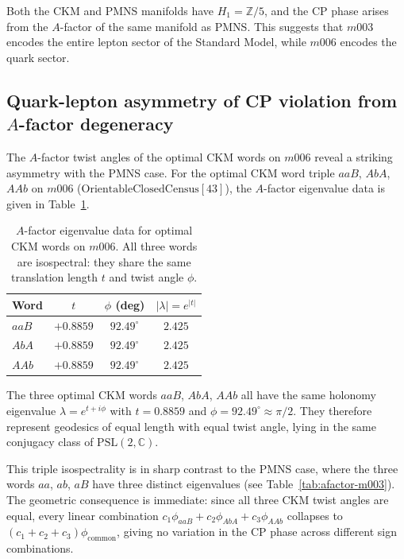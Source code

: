 ﻿\documentclass[epjc3]{svjour3}
\begin{document}
Both the CKM and PMNS manifolds have $H_1 = \mathbb{Z}/5$, and the
CP phase arises from the $A$-factor of the same manifold as PMNS.
This suggests that $m003$ encodes the entire lepton sector of the
Standard Model, while $m006$ encodes the quark sector.

\subsection{Quark-lepton asymmetry of CP violation from $A$-factor degeneracy}
\label{subsec:asymmetry}

The $A$-factor twist angles of the optimal CKM words on $m006$ reveal
a striking asymmetry with the PMNS case.  For the optimal CKM word
triple $aaB$, $AbA$, $AAb$ on $m006$
($\mathrm{OrientableClosedCensus}[43]$), the $A$-factor eigenvalue
data is given in Table~\ref{tab:afactor-m006}.

\begin{table}[ht]
\caption{$A$-factor eigenvalue data for optimal CKM words on $m006$.
  All three words are isospectral: they share the same translation
  length $t$ and twist angle $\phi$.}
\label{tab:afactor-m006}
\centering
\begin{tabular}{lccc}
\toprule
Word & $t$ & $\phi$ (deg) & $|\lambda| = e^{|t|}$ \\
\midrule
$aaB$ & $+0.8859$ & $92.49^\circ$ & $2.425$ \\
$AbA$ & $+0.8859$ & $92.49^\circ$ & $2.425$ \\
$AAb$ & $+0.8859$ & $92.49^\circ$ & $2.425$ \\
\bottomrule
\end{tabular}
\end{table}

\begin{proposition}
\label{prop:triple}
The three optimal CKM words $aaB$, $AbA$, $AAb$ all have the same
holonomy eigenvalue $\lambda = e^{t+i\phi}$ with $t = 0.8859$ and
$\phi = 92.49^\circ \approx \pi/2$.  They therefore represent
geodesics of equal length with equal twist angle, lying in the same
conjugacy class of $\mathrm{PSL}(2,\mathbb{C})$.
\end{proposition}

This triple isospectrality is in sharp contrast to the PMNS case,
where the three words $aa$, $ab$, $aB$ have three distinct
eigenvalues (see Table~\ref{tab:afactor-m003}).  The geometric
consequence is immediate: since all three CKM twist angles are equal,
every linear combination
$c_1\phi_{aaB} + c_2\phi_{AbA} + c_3\phi_{AAb}$
collapses to $(c_1 + c_2 + c_3)\phi_{\mathrm{common}}$, giving no
variation in the CP phase across different sign combinations.
\end{document}
